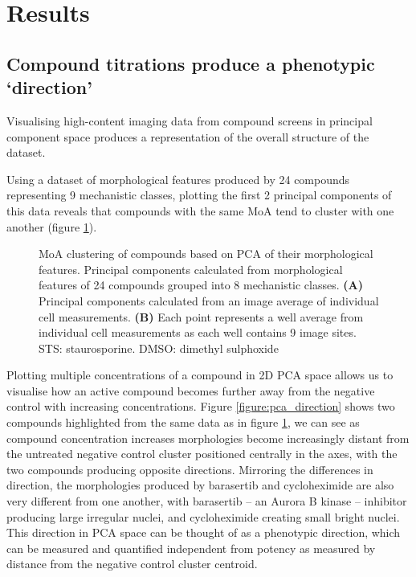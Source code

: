 \documentclass[a4paper,11pt,twoside,openright]{scrbook}
\begin{document}




\section{Results}

\subsection{Compound titrations produce a phenotypic `direction'}
 
Visualising high-content imaging data from compound screens in principal component space produces a representation of the overall structure of the dataset.

Using a dataset of morphological features produced by 24 compounds representing 9 mechanistic classes, plotting the first 2 principal components of this data reveals that compounds with the same MoA tend to cluster with one another (figure \ref{figure:pca_clustering}).

\begin{figure}
    \captionsetup{width=0.8\textwidth}
    \caption[PCA compound clustering based on MoA]{
MoA clustering of compounds based on PCA of their morphological features. 
Principal components calculated from morphological features of 24 compounds grouped into 8 mechanistic classes.
\textbf{(A)} Principal components calculated from an image average of individual cell measurements.
\textbf{(B)} Each point represents a well average from individual cell measurements as each well contains 9 image sites.
STS: staurosporine.
DMSO: dimethyl sulphoxide
}
    
    \label{figure:pca_clustering}
\end{figure}


Plotting multiple concentrations of a compound in 2D PCA space allows us to visualise how an active compound becomes further away from the negative control with increasing concentrations.
Figure \ref{figure:pca_direction} shows two compounds highlighted from the same data as in figure \ref{figure:pca_clustering}, we can see as compound concentration increases morphologies become increasingly distant from the untreated negative control cluster positioned centrally in the axes, with the two compounds producing opposite directions.
Mirroring the differences in direction, the morphologies produced by barasertib and cycloheximide are also very different from one another, with barasertib -- an Aurora B kinase -- inhibitor producing large irregular nuclei, and cycloheximide creating small bright nuclei.
This direction in PCA space can be thought of as a phenotypic direction, which can be measured and quantified independent from potency as measured by distance from the negative control cluster centroid.
\end{document}
